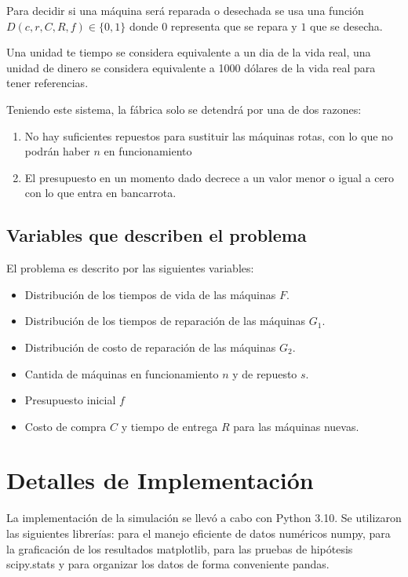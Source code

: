 \documentclass[10pt,twocolumn]{article}
\begin{document}
Para decidir si una máquina será reparada o desechada se usa una función $D(c, r, C, R, f) \in \{0, 1\}$ donde $0$ representa que se repara y $1$ que se desecha.

Una unidad te tiempo se considera equivalente a un dia de la vida real, una unidad de dinero se considera equivalente a 1000 dólares de la vida real para tener referencias.

Teniendo este sistema, la fábrica solo se detendrá por una de dos razones:
\begin{enumerate}
    \item No hay suficientes repuestos para sustituir las máquinas rotas, con lo que no podrán haber $n$ en funcionamiento
    \item El presupuesto en un momento dado decrece a un valor menor o igual a cero con lo que entra en bancarrota.
\end{enumerate}

\subsection{Variables que describen el problema}
El problema es descrito por las siguientes variables:
\begin{itemize}
	\item Distribución de los tiempos de vida de las máquinas $F$.
	\item Distribución de los tiempos de reparación de las máquinas $G_{1}$.
    \item Distribución de costo de reparación de las máquinas $G_{2}$.
	\item Cantida de máquinas en funcionamiento $n$ y de repuesto $s$.
	\item Presupuesto inicial $f$
	\item Costo de compra $C$ y tiempo de entrega $R$ para las máquinas nuevas.
\end{itemize}


\section{Detalles de Implementación}

La implementación de la simulación se llevó a cabo con Python 3.10. Se utilizaron las siguientes librerías: para el manejo eficiente de datos numéricos numpy, para la graficación de los resultados matplotlib, para las pruebas de hipótesis scipy.stats y para organizar los datos de forma conveniente pandas.
\end{document}
